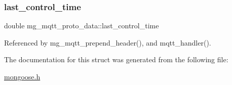 \subsubsection{\texorpdfstring{last\+\_\+control\+\_\+time}{last\_control\_time}}
{\footnotesize\ttfamily double mg\+\_\+mqtt\+\_\+proto\+\_\+data\+::last\+\_\+control\+\_\+time}



Referenced by mg\+\_\+mqtt\+\_\+prepend\+\_\+header(), and mqtt\+\_\+handler().



The documentation for this struct was generated from the following file\+:\begin{DoxyCompactItemize}
\item 
\hyperlink{mongoose_8h}{mongoose.\+h}\end{DoxyCompactItemize}
